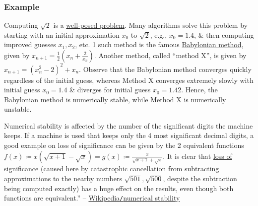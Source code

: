 \documentclass{article}
\begin{document}
\subsubsection{Example}
Computing $\sqrt{2}$ is a \href{https://en.wikipedia.org/wiki/Well-posed_problem}{well-posed problem}. Many algorithms solve this problem by starting with an initial approximation $x_0$ to $\sqrt{2}$, e.g., $x_0 = 1.4$, \& then computing improved guesses $x_1,x_2$, etc. 1 such method is the famous \href{https://en.wikipedia.org/wiki/Babylonian_method}{Babylonian method}, given by $x_{n+1} = \frac{1}{2}\left(x_n + \frac{2}{x_n}\right)$. Another method, called ``method X'', is given by $x_{n+1} = (x_n^2 - 2)^2 + x_n$. Observe that the Babylonian method converges quickly regardless of the initial guess, whereas Method X converges extremely slowly with initial guess $x_0 = 1.4$ \& diverges for initial guess $x_0 = 1.42$. Hence, the Babylonian method is numerically stable, while Method X is numerically unstable.

Numerical stability is affected by the number of the significant digits the machine keeps. If a machine is used that keeps only the 4 most significant decimal digits, a good example on loss of significance can be given by the 2 equivalent functions $f(x)\coloneqq x(\sqrt{x + 1} - \sqrt{x}) = g(x)\coloneqq\frac{x}{\sqrt{x + 1} + \sqrt{x}}$. It is clear that \href{https://en.wikipedia.org/wiki/Loss_of_significance}{loss of significance} (caused here by \href{https://en.wikipedia.org/wiki/Catastrophic_cancellation}{catastrophic cancellation} from subtracting approximations to the nearby numbers $\sqrt{501},\sqrt{500}$, despite the subtraction being computed exactly) has a huge effect on the results, even though both functions are equivalent.'' -- \href{https://en.wikipedia.org/wiki/Numerical_stability}{Wikipedia{\tt/}numerical stability}

\end{document}
